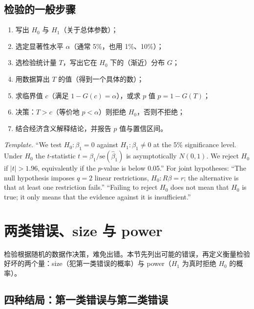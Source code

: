 \subsection{检验的一般步骤}

\begin{method}[假设检验的七个步骤]
\begin{enumerate}
  \item 写出 $H_0$ 与 $H_1$（关于总体参数）；
  \item 选定显著性水平 $\alpha$（通常 5\%，也用 1\%、10\%）；
  \item 选检验统计量 $T$，写出它在 $H_0$ 下的（渐近）分布 $G$；
  \item 用数据算出 $T$ 的值（得到一个具体的数）；
  \item 求临界值 $c$（满足 $1-G(c)=\alpha$），或求 $p$ 值 $p=1-G(T)$；
  \item 决策：$T>c$（等价地 $p<\alpha$）则拒绝 $H_0$，否则不拒绝；
  \item 结合经济含义解释结论，并报告 $p$ 值与置信区间。
\end{enumerate}
\end{method}

\begin{english}
\textit{Template.} ``We test $H_0:\beta_1=0$ against $H_1:\beta_1\neq0$ at the 5\% significance level. Under $H_0$ the $t$-statistic $t=\hat\beta_1/\mathrm{se}(\hat\beta_1)$ is asymptotically $N(0,1)$. We reject $H_0$ if $|t|>1.96$, equivalently if the $p$-value is below 0.05.'' For joint hypotheses: ``The null hypothesis imposes $q=2$ linear restrictions, $H_0:R\beta=r$; the alternative is that at least one restriction fails.'' ``Failing to reject $H_0$ does not mean that $H_0$ is true; it only means that the evidence against it is insufficient.''
\end{english}

\section{两类错误、size 与 power}\label{sec:U06a-errors}

检验根据随机的数据作决策，难免出错。本节先列出可能的错误，再定义衡量检验好坏的两个量：size（犯第一类错误的概率）与 power（$H_1$ 为真时拒绝 $H_0$ 的概率）。

\subsection{四种结局：第一类错误与第二类错误}

